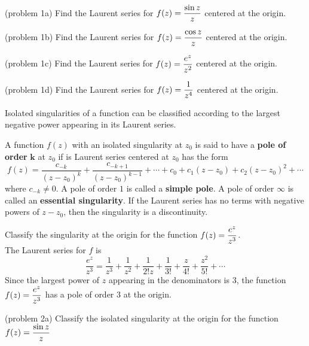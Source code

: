 \documentclass[handout]{ximera}
\begin{document}
\begin{problem}(problem 1a)
Find the Laurent series for $\displaystyle f(z) = \frac{\sin z}{z}$ centered at the origin.
\end{problem}

\begin{problem}(problem 1b)
Find the Laurent series for $\displaystyle f(z) = \frac{\cos z}{z}$ centered at the origin.
\end{problem}

\begin{problem}(problem 1c)
Find the Laurent series for $\displaystyle f(z) = \frac{e^z}{z^2}$ centered at the origin.
\end{problem}

\begin{problem}(problem 1d)
Find the Laurent series for $\displaystyle f(z) = \frac{1}{z^4}$ centered at the origin.
\end{problem}

Isolated singularities of a function can be classified according to the largest negative power appearing in
its Laurent series.

\begin{definition}
A function $f(z)$ with an isolated singularity at $z_0$ is said to have a {\bf pole of order} $\boldsymbol{k}$ at $z_0$
if is Laurent series centered at $z_0$ has the form
\[
f(z) = \frac{c_{-k}}{(z-z_0)^k} +  \frac{c_{-k+1}}{(z-z_0)^{k-1}} + \cdots + c_0 + c_1(z-z_0) + c_2(z-z_0)^2 + \cdots
\]
where $c_{-k} \neq 0$.
A pole of order $1$ is called a {\bf simple pole}. A pole of order $\infty$ is called an {\bf essential singularity}.
If the Laurent series has no terms with negative powers of $z-z_0$, then the singularity is a discontinuity.
\end{definition}

\begin{example}[example 2]
Classify the singularity at the origin for the function $\displaystyle f(z) = \frac{e^z}{z^3}$.\\
The Laurent series for $f$ is
\[
\frac{e^z}{z^3} = \frac{1}{z^3} + \frac{1}{z^2} + \frac{1}{2!z} + \frac{1}{3!} + \frac{z}{4!} + \frac{z^2}{5!} + \cdots
\]
Since the largest power of $z$ appearing in the denominators is $3$, the function $\displaystyle f(z) = \frac{e^z}{z^3}$
has a pole of order $3$ at the origin.
\end{example}

\begin{problem}(problem 2a)
Classify the isolated singularity at the origin for the function $\displaystyle f(z) = \frac{\sin z}{z}$
\begin{multipleChoice}
\end{multipleChoice}
\end{problem}
\end{document}
